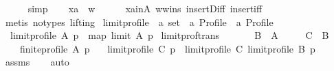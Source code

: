 \begin{isabellebody}
\ \ \ \ \isamarkupfalse%
\ simp\isanewline
\ \ \isamarkupfalse%
\ {\isachardoublequoteopen}xa\ {\isacharequal}{\kern0pt}\ w{\isachardoublequoteclose}\isanewline
\ \ \ \ \isamarkupfalse%
\ xa{\isacharunderscore}{\kern0pt}in{\isacharunderscore}{\kern0pt}A\ w{\isacharunderscore}{\kern0pt}wins\ insert{\isacharunderscore}{\kern0pt}Diff\ insert{\isacharunderscore}{\kern0pt}iff\isanewline
\ \ \ \ \isamarkupfalse%
\ {\isacharparenleft}{\kern0pt}metis\ {\isacharparenleft}{\kern0pt}no{\isacharunderscore}{\kern0pt}types{\isacharcomma}{\kern0pt}\ lifting{\isacharparenright}{\kern0pt}{\isacharparenright}{\kern0pt}\isanewline
{}\isamarkupfalse%
%
\endisatagproof
{\isafoldproof}%
%
\isadelimproof
%
\endisadelimproof
%
\isadelimdocument
%
\endisadelimdocument
%
\isatagdocument
%
\isamarkuptrue%
%
\endisatagdocument
{\isafolddocument}%
%
\isadelimdocument
%
\endisadelimdocument
{}\isamarkupfalse%
\ limit{\isacharunderscore}{\kern0pt}profile\ {\isacharcolon}{\kern0pt}{\isacharcolon}{\kern0pt}\ {\isachardoublequoteopen}{\isacharprime}{\kern0pt}a\ set\ {\isasymRightarrow}\ {\isacharprime}{\kern0pt}a\ Profile\ {\isasymRightarrow}\ {\isacharprime}{\kern0pt}a\ Profile{\isachardoublequoteclose}\ \isanewline
\ \ {\isachardoublequoteopen}limit{\isacharunderscore}{\kern0pt}profile\ A\ p\ {\isacharequal}{\kern0pt}\ map\ {\isacharparenleft}{\kern0pt}limit\ A{\isacharparenright}{\kern0pt}\ p{\isachardoublequoteclose}\isanewline
\isanewline
{}\isamarkupfalse%
\ limit{\isacharunderscore}{\kern0pt}prof{\isacharunderscore}{\kern0pt}trans{\isacharcolon}{\kern0pt}\isanewline
\ \ \isanewline
\ \ \ \ {\isachardoublequoteopen}B\ {\isasymsubseteq}\ A{\isachardoublequoteclose}\ \isanewline
\ \ \ \ {\isachardoublequoteopen}C\ {\isasymsubseteq}\ B{\isachardoublequoteclose}\ \isanewline
\ \ \ \ {\isachardoublequoteopen}finite{\isacharunderscore}{\kern0pt}profile\ A\ p{\isachardoublequoteclose}\isanewline
\ \ \ {\isachardoublequoteopen}limit{\isacharunderscore}{\kern0pt}profile\ C\ p\ {\isacharequal}{\kern0pt}\ limit{\isacharunderscore}{\kern0pt}profile\ C\ {\isacharparenleft}{\kern0pt}limit{\isacharunderscore}{\kern0pt}profile\ B\ p{\isacharparenright}{\kern0pt}{\isachardoublequoteclose}\isanewline
%
\isadelimproof
\ \ %
\endisadelimproof
%
\isatagproof
{}\isamarkupfalse%
\ assms\isanewline
\ \ \isamarkupfalse%
\ auto%
\endisatagproof

\end{isabellebody}
